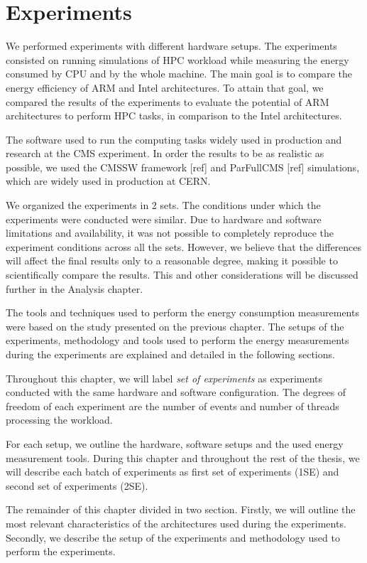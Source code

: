 \chapter{Experiments}


We performed experiments with different hardware setups. The experiments consisted on running simulations of HPC workload while measuring the energy consumed by CPU and by the whole machine.
The main goal is to compare the energy efficiency of ARM and Intel architectures. To attain that goal, we compared the results
of the experiments to evaluate the potential of ARM architectures to perform HPC tasks, in
comparison to the Intel architectures.

The software used to run the computing tasks
widely used in production and research at the CMS experiment. In order the results to be as realistic as possible, we used the CMSSW framework [ref] and ParFullCMS [ref] simulations, which are widely used in production at CERN.

We organized the experiments in 2 sets. The conditions under which the
experiments were conducted were similar. Due to hardware and software
limitations and availability, it was not possible to completely reproduce the experiment
conditions across all the sets. However, we believe that the differences will
affect the final results only to a reasonable degree, making it possible to scientifically compare the results. This and other considerations will be discussed further in the Analysis chapter. 

The tools and techniques used to perform the energy
consumption measurements were based on the study presented on the previous
chapter. The setups of the experiments, methodology and tools used to perform the energy
measurements during the experiments are explained and detailed in the following
sections.

Throughout this chapter, we will label \textit{set of experiments} as experiments conducted with
the same hardware and software configuration. The degrees of freedom of each
experiment are the number of events and number of threads processing the workload.
 
For each setup, we outline the hardware, software setups and the used energy measurement tools. 
During this chapter and throughout the rest of the thesis, we will describe
each batch of experiments as first set of experiments (1SE) and second set of experiments (2SE).

The remainder of this chapter divided in two section. Firstly, we will outline the most relevant characteristics of the
architectures used during the experiments.  Secondly, we describe
the setup of the experiments and methodology used to perform the experiments. 

